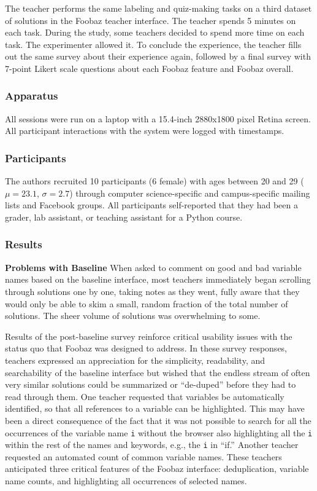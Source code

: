 The teacher performs the same labeling and quiz-making tasks on a third dataset of solutions in the Foobaz teacher interface. The teacher spends 5 minutes on each task. During the study, some teachers decided to spend more time on each task. The experimenter allowed it. To conclude the experience, the teacher fills out the same survey about their experience again, followed by a final survey with 7-point Likert scale questions about each Foobaz feature and Foobaz overall.

\subsubsection{Apparatus}

All sessions were run on a laptop with a 15.4-inch 2880x1800 pixel Retina screen. All participant interactions with the system were logged with timestamps.

\subsubsection{Participants}

The authors recruited 10 participants (6 female) with ages between 20 and 29 ($\mu=23.1$, $\sigma=2.7$) through computer science-specific and campus-specific mailing lists and Facebook groups. All participants self-reported that they had been a grader, lab assistant, or teaching assistant for a Python course. 

\subsubsection{Results}

\textbf{Problems with Baseline} When asked to comment on good and bad variable names based on the baseline interface, most teachers immediately began scrolling through solutions one by one, taking notes as they went, fully aware that they would only be able to skim a small, random fraction of the total number of solutions. The sheer volume of solutions was overwhelming to some. 

Results of the post-baseline survey reinforce critical usability issues with the status quo that Foobaz was designed to address. In these survey responses, teachers expressed an appreciation for the simplicity, readability, and searchability of the baseline interface but wished that the endless stream of often very similar solutions could be summarized or ``de-duped'' before they had to read through them. One teacher requested that variables be automatically identified, so that all references to a variable can be highlighted. This may have been a direct consequence of the fact that it was not possible to search for all the occurrences of the variable name \texttt{i} without the browser also highlighting all the \texttt{i} within the rest of the names and keywords, e.g., the \texttt{i} in ``if.'' Another teacher requested an automated count of common variable names. These teachers anticipated three critical features of the Foobaz interface: deduplication, variable name counts, and highlighting all occurrences of selected names.

